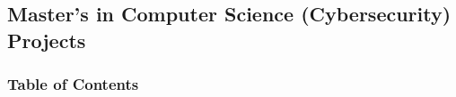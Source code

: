 \subsection{Master's in Computer Science (Cybersecurity) Projects}

\subsubsection{Table of Contents}